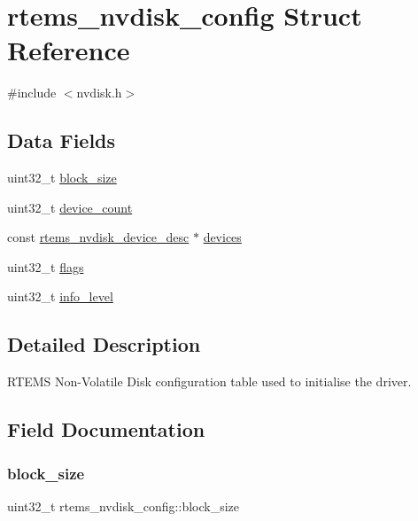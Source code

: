 \hypertarget{structrtems__nvdisk__config}{}\section{rtems\+\_\+nvdisk\+\_\+config Struct Reference}
\label{structrtems__nvdisk__config}


{\ttfamily \#include $<$nvdisk.\+h$>$}

\subsection*{Data Fields}
\begin{DoxyCompactItemize}
\item 
uint32\+\_\+t \mbox{\hyperlink{structrtems__nvdisk__config_a1ef7e46bea462726d59bdf09db849411}{block\+\_\+size}}
\item 
uint32\+\_\+t \mbox{\hyperlink{structrtems__nvdisk__config_a2eea213106e5bf7aec718afa0fc3a6e8}{device\+\_\+count}}
\item 
const \mbox{\hyperlink{structrtems__nvdisk__device__desc}{rtems\+\_\+nvdisk\+\_\+device\+\_\+desc}} $\ast$ \mbox{\hyperlink{structrtems__nvdisk__config_afc56006126f8fa423d23d5dd89109753}{devices}}
\item 
uint32\+\_\+t \mbox{\hyperlink{structrtems__nvdisk__config_a382c29e7f4f4dc3b698155c104d020ad}{flags}}
\item 
uint32\+\_\+t \mbox{\hyperlink{structrtems__nvdisk__config_a2885996e10f6cdf96319ca07c7f22b57}{info\+\_\+level}}
\end{DoxyCompactItemize}


\subsection{Detailed Description}
R\+T\+E\+MS Non-\/\+Volatile Disk configuration table used to initialise the driver. 

\subsection{Field Documentation}
\mbox{\label{structrtems__nvdisk__config_a1ef7e46bea462726d59bdf09db849411}} 
\subsubsection{\texorpdfstring{block\_size}{block\_size}}
{\footnotesize\ttfamily uint32\+\_\+t rtems\+\_\+nvdisk\+\_\+config\+::block\+\_\+size}

